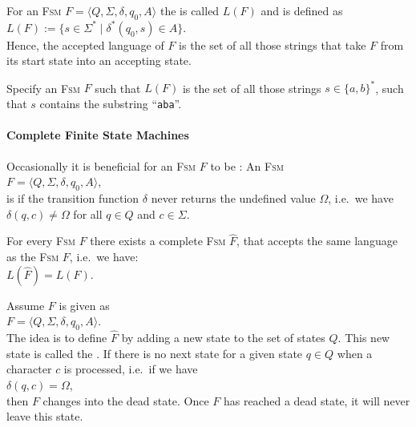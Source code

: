 \begin{Definition}
   
  For an \textsc{Fsm} $F = \langle Q, \Sigma, \delta, q_0, A \rangle$ the  
  is called $L(F)$ and is defined as
  \\[0.2cm]
  \hspace*{1.3cm}
  $L(F) := \bigl\{ s \in \Sigma^* \mid \delta^*(q_0,s) \in A \bigr\}$. 
  \\[0.2cm]
  Hence, the accepted language of $F$ is the set of all those strings that take $F$ from its
  start state into an accepting state. \eox
\end{Definition}

\exerciseEng
Specify an \textsc{Fsm} $F$ such that $L(F)$ is the set of all those strings $s \in \{a,b\}^*$, 
such that $s$ contains the substring  ``\texttt{aba}''.
\eox


\paragraph{Complete Finite State Machines}
Occasionally it is beneficial for an \textsc{Fsm} $F$ to be : An \textsc{Fsm}
\\[0.2cm]
\hspace*{1.3cm}
$F = \langle Q, \Sigma, \delta, q_0, A \rangle$,
\\[0.2cm]
is  if the transition function $\delta$ never returns the
undefined value $\Omega$, i.e.~we have 
\\[0.2cm]
\hspace*{1.3cm}
$\delta(q, c) \not= \Omega$ \quad for all $q \in Q$ and $c \in \Sigma$.

\begin{Proposition}
  For every \textsc{Fsm} $F$ there exists a complete \textsc{Fsm}  $\widehat{F}$, that accepts
  the same language as the \textsc{Fsm}  $F$, i.e.~we have:
  \\[0.2cm]
  \hspace*{1.3cm}
  $L(\widehat{F}) = L(F)$.
\end{Proposition}

\proofEng
Assume $F$ is given as
\\[0.2cm]
\hspace*{1.3cm}
$F = \langle Q, \Sigma, \delta, q_0, A \rangle$.
\\[0.2cm]
The idea is to define $\widehat{F}$ by adding a new state to the set of states $Q$.  This new state is called
the  .  If there is no next state for a given state  $q \in Q$ when a character $c$
is processed, i.e.~if we have
\\[0.2cm]
\hspace*{1.3cm}
$\delta(q, c) = \Omega$,
\\[0.2cm]
then $F$ changes into the dead state.  Once $F$ has reached a dead state, it will never leave this
state.


